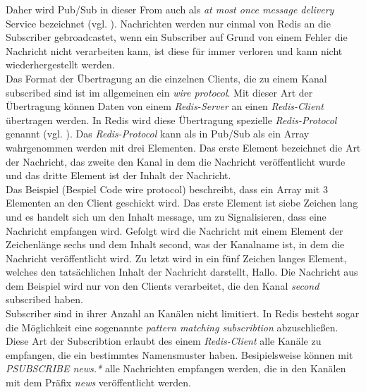 Daher wird \acs{Pub/Sub} in dieser From auch als \textit{at most once message delivery} Service bezeichnet (vgl. \cite{Redis-PubSub}). Nachrichten werden nur einmal von \acs{Redis} an die Subscriber gebroadcastet, wenn ein Subscriber auf Grund von einem Fehler die Nachricht nicht verarbeiten kann, ist diese für immer verloren und kann nicht wiederhergestellt werden. 
\\
Das Format der Übertragung an die einzelnen Clients, die zu einem Kanal subscribed sind ist im allgemeinen ein \textit{wire protocol}. Mit dieser Art der Übertragung können Daten von einem \textit{Redis-Server} an einen \textit{Redis-Client} übertragen werden.
In \acs{Redis} wird diese Übertragung spezielle \textit{Redis-Protocol} genannt (vgl. \cite{Redis-PubSub}).
Das \textit{Redis-Protocol} kann als in \acs{Pub/Sub} als ein Array wahrgenommen werden mit drei Elementen. Das erste Element bezeichnet die Art der Nachricht, das zweite den Kanal in dem die Nachricht veröffentlicht wurde und das dritte Element ist der Inhalt der Nachricht. 
\\
Das Beispiel (Bespiel Code wire protocol) beschreibt, dass ein Array mit 3 Elementen an den Client geschickt wird. Das erste Element ist siebe Zeichen lang und es handelt sich um den Inhalt message, um zu Signalisieren, dass eine Nachricht empfangen wird. Gefolgt wird die Nachricht mit einem Element der Zeichenlänge sechs und dem Inhalt second, was der Kanalname ist, in dem die Nachricht veröffentlicht wird. Zu letzt wird in ein fünf Zeichen langes Element, welches den tatsächlichen Inhalt der Nachricht darstellt, \glqq Hallo\grqq.
Die Nachricht aus dem Beispiel wird nur von den Clients verarbeitet, die den Kanal \textit{second} subscribed haben.
\\
Subscriber sind in ihrer Anzahl an Kanälen nicht limitiert. In \acs{Redis} besteht sogar die Möglichkeit eine sogenannte \textit{pattern matching subscribtion} abzuschließen. Diese Art der Subscribtion erlaubt des einem \textit{Redis-Client} alle Kanäle zu empfangen, die ein bestimmtes Namensmuster haben. Besipielsweise können mit \textit{PSUBSCRIBE news.*} alle Nachrichten empfangen werden, die in den Kanälen mit dem Präfix \textit{news} veröffentlicht werden.